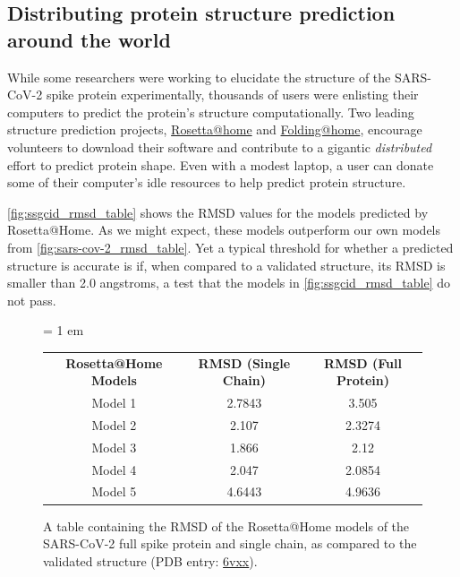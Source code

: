 \begin{qbox}\end{qbox}

\subsection{Distributing protein structure prediction around the world}

While some researchers were working to elucidate the structure of the SARS-CoV-2 spike protein experimentally, thousands of users were enlisting their computers to predict the protein's structure computationally. Two leading structure prediction projects, \href{https://boinc.bakerlab.org}{Rosetta@home} and \href{https://foldingathome.org}{Folding@home}, encourage volunteers to download their software and contribute to a gigantic \textit{distributed} effort to predict protein shape. Even with a modest laptop, a user can donate some of their computer's idle resources to help predict protein structure. 

\autoref{fig:ssgcid_rmsd_table} shows the RMSD values for the models predicted by Rosetta@Home. As we might expect, these models outperform our own models from \autoref{fig:sars-cov-2_rmsd_table}. Yet a typical threshold for whether a predicted structure is accurate is if, when compared to a validated structure, its RMSD is smaller than 2.0 angstroms, a test that the models in \autoref{fig:ssgcid_rmsd_table} do not pass.\\

\begin{figure}[h]
	\centering
	\tabcolsep = 1 em
	\mySfFamily
	\begin{tabular}{c c c}
		\textbf{Rosetta@Home Models} & \textbf{RMSD (Single Chain)} & \textbf{RMSD (Full Protein)}\\
		Model 1  & 2.7843 & 3.505\phantom{x}  \\
		Model 2  & 2.107\phantom{x} & 2.3274 \\
		Model 3  & 1.866\phantom{x} & 2.12\phantom{xx} \\
		Model 4  & 2.047\phantom{x} & 2.0854 \\
		Model 5  & 4.6443 & 4.9636
	\end{tabular}
	\caption{A table containing the RMSD of the Rosetta@Home models of the SARS-CoV-2 full spike protein and single chain, as compared to the validated structure (PDB entry: \href{https://www.rcsb.org/structure/6vxx}{6vxx}).}
	\label{fig:ssgcid_rmsd_table}
\end{figure}


